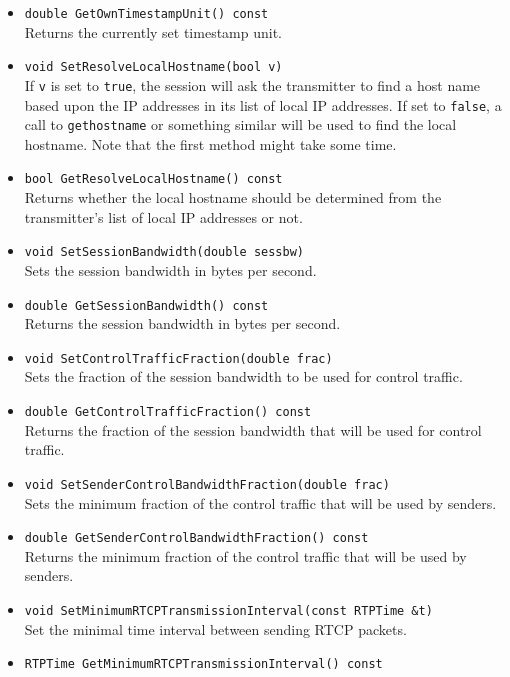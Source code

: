 \documentclass[12pt,a4paper]{article}
\begin{document}
\begin{itemize}
					\item {\tt double GetOwnTimestampUnit() const}\\
						Returns the currently set timestamp unit.
					\item {\tt void SetResolveLocalHostname(bool v)}\\
						If {\tt v} is set to {\tt true}, the session will ask
						the transmitter to find a host name based upon the IP
						addresses in its list of local IP addresses. If set to
						{\tt false}, a call to {\tt gethostname} or something
						similar will be used to find the local hostname. Note
						that the first method might take some time.
					\item {\tt bool GetResolveLocalHostname() const}\\
						Returns whether the local hostname should be determined
						from the transmitter's list of local IP addresses or not.
					\item {\tt void SetSessionBandwidth(double sessbw)}\\
						Sets the session bandwidth in bytes per second.
					\item {\tt double GetSessionBandwidth() const}\\
						Returns the session bandwidth in bytes per second.
					\item {\tt void SetControlTrafficFraction(double frac)}\\
						Sets the fraction of the session bandwidth to be used
						for control traffic.
					\item {\tt double GetControlTrafficFraction() const}\\
						Returns the fraction of the session bandwidth that will
						be used for control traffic.
					\item {\tt void SetSenderControlBandwidthFraction(double frac)}\\
						Sets the minimum fraction of the control traffic that
						will be used by senders.
					\item {\tt double GetSenderControlBandwidthFraction() const}\\
						Returns the minimum fraction of the control traffic that
						will be used by senders.
					\item {\tt void SetMinimumRTCPTransmissionInterval(const RTPTime \&t)}\\
						Set the minimal time interval between sending RTCP packets.
					\item {\tt RTPTime GetMinimumRTCPTransmissionInterval() const}\\

\end{itemize}
\end{document}
